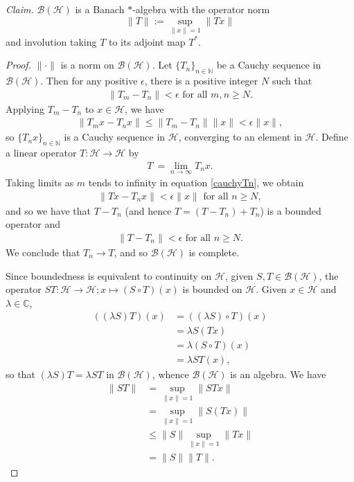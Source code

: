 \documentclass[12pt,a4paper]{amsart}
\theoremstyle{plain}
\theoremstyle{definition}
\renewcommand{\H}{\mathcal{H}}
\newcommand{\B}{\mathcal{B}}
\newcommand{\BH}{\mathcal{\B(\H)}}
\newcommand{\1}{\mathbbm{1}}
\newcommand{\C}{\mathbb{C}}
\newcommand{\N}{\mathbb{N}}
\begin{document}
\emph{Claim.} $\B(\H)$ is a Banach $\ast$-algebra with the operator norm 
\[
	\|T\|:= \sup_{\|x\|=1}{\|Tx\|}
\]
and involution taking $T$ to its adjoint map $T^\ast$.
\begin{proof}
$\|\cdot\|$ is a norm on $\BH$. Let $\{T_n\}_{n\in\N}$ be a Cauchy sequence 
in $\BH$. Then for any positive $\epsilon$, there is a positive integer $N$ such that 
\begin{align*}
	\|T_m-T_n\| < \epsilon \mbox{ for all } m,n \geq N.
\end{align*}
Applying $T_m-T_n$ to $x \in \H$, we have 
\begin{align}\label{cauchyTn}
	\|T_mx-T_nx\| \leq \|T_m-T_n\| \|x\| < \epsilon \|x\|,
\end{align}
so $\{T_nx\}_{n\in\N}$ is a Cauchy sequence in $\H$, converging to an element in $\H$.
Define a linear operator $T:\H \to \H$ by 
\begin{align*}
	T\:= \lim_{n\to\infty}{T_nx}.
\end{align*}
Taking limits as $m$ tends to infinity in equation \eqref{cauchyTn}, we obtain
\begin{align*}
	\|Tx-T_nx\| < \epsilon \|x\| \mbox{ for all }n \geq N,
\end{align*}
and so we have that $T-T_n$ (and hence $T=(T-T_n)+T_n$) is a bounded operator and  
\begin{align*}
	\|T-T_n\| <\epsilon \mbox{ for all }n \geq N.
\end{align*}
We conclude that $T_n \to T$, and so $\BH$ is complete.

Since boundedness is equivalent to continuity on $\H$, given $S,T\in\BH$, the operator 
$ST:\H \to \H; x \mapsto (S\circ T)(x)$ is bounded on $\H$.
Given $x\in\H$ and $\lambda\in\C$, 
\begin{align*}
		((\lambda S)T)(x)
	&=	((\lambda S)\circ T)(x)												\\
	&=	\lambda S(Tx)														\\
	&=	\lambda (S\circ T)(x)												\\
	&=	\lambda ST(x),
\end{align*} 
so that $(\lambda S)T = \lambda ST$ in $\BH$, whence $\BH$ is an algebra.
We have 
\begin{align*}
			\|ST\|
	&=		\sup_{\|x\|=1}{\|STx\|} 										\\
	&=		\sup_{\|x\|=1}{\|S(Tx)\|} 										\\
	&\leq	\|S\| \sup_{\|x\|=1}{\|Tx\|} 									\\
	&=		\|S\| \|T\|.
\end{align*}


\end{proof}
\end{document}
